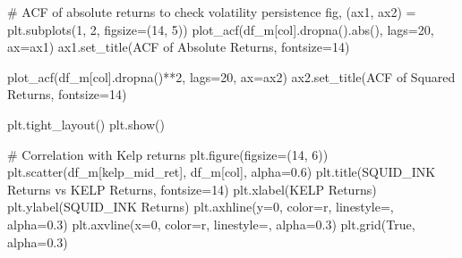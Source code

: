 \documentclass[
  letterpaper,
  DIV=11,
  numbers=noendperiod]{scrartcl}
\newenvironment{Shaded}{\begin{snugshade}}{\end{snugshade}}
\newcommand{\BuiltInTok}[1]{\textcolor[rgb]{0.00,0.23,0.31}{#1}}
\newcommand{\CommentTok}[1]{\textcolor[rgb]{0.37,0.37,0.37}{#1}}
\newcommand{\DecValTok}[1]{\textcolor[rgb]{0.68,0.00,0.00}{#1}}
\newcommand{\FloatTok}[1]{\textcolor[rgb]{0.68,0.00,0.00}{#1}}
\newcommand{\NormalTok}[1]{\textcolor[rgb]{0.00,0.23,0.31}{#1}}
\newcommand{\OperatorTok}[1]{\textcolor[rgb]{0.37,0.37,0.37}{#1}}
\newcommand{\StringTok}[1]{\textcolor[rgb]{0.13,0.47,0.30}{#1}}
\newcommand{\VariableTok}[1]{\textcolor[rgb]{0.07,0.07,0.07}{#1}}
\begin{document}
\begin{Shaded}
\begin{Highlighting}[]
    \CommentTok{\# ACF of absolute returns to check volatility persistence}
\NormalTok{    fig, (ax1, ax2) }\OperatorTok{=}\NormalTok{ plt.subplots(}\DecValTok{1}\NormalTok{, }\DecValTok{2}\NormalTok{, figsize}\OperatorTok{=}\NormalTok{(}\DecValTok{14}\NormalTok{, }\DecValTok{5}\NormalTok{))}
\NormalTok{    plot\_acf(df\_m[col].dropna().}\BuiltInTok{abs}\NormalTok{(), lags}\OperatorTok{=}\DecValTok{20}\NormalTok{, ax}\OperatorTok{=}\NormalTok{ax1)}
\NormalTok{    ax1.set\_title(}\StringTok{\textquotesingle{}ACF of Absolute Returns\textquotesingle{}}\NormalTok{, fontsize}\OperatorTok{=}\DecValTok{14}\NormalTok{)}

\NormalTok{    plot\_acf(df\_m[col].dropna()}\OperatorTok{**}\DecValTok{2}\NormalTok{, lags}\OperatorTok{=}\DecValTok{20}\NormalTok{, ax}\OperatorTok{=}\NormalTok{ax2)}
\NormalTok{    ax2.set\_title(}\StringTok{\textquotesingle{}ACF of Squared Returns\textquotesingle{}}\NormalTok{, fontsize}\OperatorTok{=}\DecValTok{14}\NormalTok{)}

\NormalTok{    plt.tight\_layout()}
\NormalTok{    plt.show()}

    \CommentTok{\# Correlation with Kelp returns}
\NormalTok{    plt.figure(figsize}\OperatorTok{=}\NormalTok{(}\DecValTok{14}\NormalTok{, }\DecValTok{6}\NormalTok{))}
\NormalTok{    plt.scatter(df\_m[}\StringTok{\textquotesingle{}kelp\_mid\_ret\textquotesingle{}}\NormalTok{], df\_m[col], alpha}\OperatorTok{=}\FloatTok{0.6}\NormalTok{)}
\NormalTok{    plt.title(}\StringTok{\textquotesingle{}SQUID\_INK Returns vs KELP Returns\textquotesingle{}}\NormalTok{, fontsize}\OperatorTok{=}\DecValTok{14}\NormalTok{)}
\NormalTok{    plt.xlabel(}\StringTok{\textquotesingle{}KELP Returns\textquotesingle{}}\NormalTok{)}
\NormalTok{    plt.ylabel(}\StringTok{\textquotesingle{}SQUID\_INK Returns\textquotesingle{}}\NormalTok{)}
\NormalTok{    plt.axhline(y}\OperatorTok{=}\DecValTok{0}\NormalTok{, color}\OperatorTok{=}\StringTok{\textquotesingle{}r\textquotesingle{}}\NormalTok{, linestyle}\OperatorTok{=}\StringTok{\textquotesingle{}{-}{-}\textquotesingle{}}\NormalTok{, alpha}\OperatorTok{=}\FloatTok{0.3}\NormalTok{)}
\NormalTok{    plt.axvline(x}\OperatorTok{=}\DecValTok{0}\NormalTok{, color}\OperatorTok{=}\StringTok{\textquotesingle{}r\textquotesingle{}}\NormalTok{, linestyle}\OperatorTok{=}\StringTok{\textquotesingle{}{-}{-}\textquotesingle{}}\NormalTok{, alpha}\OperatorTok{=}\FloatTok{0.3}\NormalTok{)}
\NormalTok{    plt.grid(}\VariableTok{True}\NormalTok{, alpha}\OperatorTok{=}\FloatTok{0.3}\NormalTok{)}


\end{Highlighting}
\end{Shaded}
\end{document}
